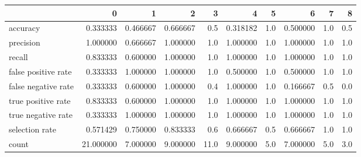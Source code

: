 \begin{tabular}{lrrrrrrrrr}
\toprule
{} &          0 &         1 &         2 &     3 &         4 &    5 &         6 &    7 &    8 \\
\midrule
accuracy            &   0.333333 &  0.466667 &  0.666667 &   0.5 &  0.318182 &  1.0 &  0.500000 &  1.0 &  0.5 \\
precision           &   1.000000 &  0.666667 &  1.000000 &   1.0 &  1.000000 &  1.0 &  1.000000 &  1.0 &  1.0 \\
recall              &   0.833333 &  0.600000 &  1.000000 &   1.0 &  1.000000 &  1.0 &  1.000000 &  1.0 &  1.0 \\
false positive rate &   0.333333 &  1.000000 &  1.000000 &   1.0 &  0.500000 &  1.0 &  0.500000 &  1.0 &  1.0 \\
false negative rate &   0.333333 &  0.600000 &  1.000000 &   0.4 &  1.000000 &  1.0 &  0.166667 &  0.5 &  0.0 \\
true positive rate  &   0.833333 &  0.600000 &  1.000000 &   1.0 &  1.000000 &  1.0 &  1.000000 &  1.0 &  1.0 \\
true negative rate  &   0.333333 &  1.000000 &  1.000000 &   1.0 &  1.000000 &  1.0 &  1.000000 &  1.0 &  1.0 \\
selection rate      &   0.571429 &  0.750000 &  0.833333 &   0.6 &  0.666667 &  0.5 &  0.666667 &  1.0 &  1.0 \\
count               &  21.000000 &  7.000000 &  9.000000 &  11.0 &  9.000000 &  5.0 &  7.000000 &  5.0 &  3.0 \\
\bottomrule
\end{tabular}
